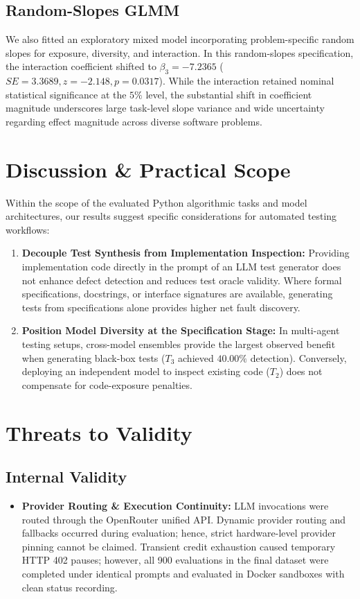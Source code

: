 \documentclass[11pt,a4paper]{article}
\begin{document}
\subsection{Random-Slopes GLMM}
We also fitted an exploratory mixed model incorporating problem-specific random slopes for exposure, diversity, and interaction. In this random-slopes specification, the interaction coefficient shifted to $\beta_3 = -7.2365$ ($SE = 3.3689, z = -2.148, p = 0.0317$). While the interaction retained nominal statistical significance at the $5\%$ level, the substantial shift in coefficient magnitude underscores large task-level slope variance and wide uncertainty regarding effect magnitude across diverse software problems.

\section{Discussion \& Practical Scope}
\label{sec:discussion}

Within the scope of the evaluated Python algorithmic tasks and model architectures, our results suggest specific considerations for automated testing workflows:

\begin{enumerate}
    \item \textbf{Decouple Test Synthesis from Implementation Inspection:} Providing implementation code directly in the prompt of an LLM test generator does not enhance defect detection and reduces test oracle validity. Where formal specifications, docstrings, or interface signatures are available, generating tests from specifications alone provides higher net fault discovery.
    \item \textbf{Position Model Diversity at the Specification Stage:} In multi-agent testing setups, cross-model ensembles provide the largest observed benefit when generating black-box tests ($T_3$ achieved $40.00\%$ detection). Conversely, deploying an independent model to inspect existing code ($T_2$) does not compensate for code-exposure penalties.
\end{enumerate}

\section{Threats to Validity}
\label{sec:threats}

\subsection{Internal Validity}
\begin{itemize}
    \item \textbf{Provider Routing \& Execution Continuity:} LLM invocations were routed through the OpenRouter unified API. Dynamic provider routing and fallbacks occurred during evaluation; hence, strict hardware-level provider pinning cannot be claimed. Transient credit exhaustion caused temporary HTTP 402 pauses; however, all 900 evaluations in the final dataset were completed under identical prompts and evaluated in Docker sandboxes with clean status recording.
\end{itemize}
\end{document}
